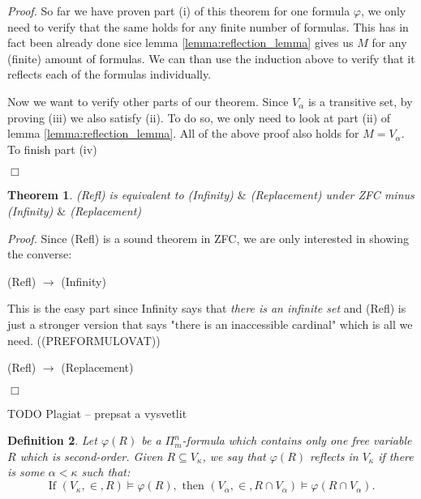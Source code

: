 \documentclass[12pt,a4paper]{article}
\newtheorem{theorem}{Theorem}[section]
\newtheorem{definition}[theorem]{Definition}
\newenvironment{proof}
{\noindent \textit{Proof.}}
{\hspace*{\fill} $\Box$}
\newcommand{\sub}{\subseteq}
\newcommand{\then}{\rightarrow}
\begin{document}
\begin{proof}
So far we have proven part (i) of this theorem for one formula $\varphi$, we only need to verify that the same holds for any finite number of formulas. This has in fact been already done sice lemma \ref{lemma:reflection_lemma} gives us $M$ for any (finite) amount of formulas. We can than use the induction above  to verify that it reflects each of the formulas individually. 

\medskip
Now we want to verify other parts of our theorem. Since $V_\alpha$ is a transitive set, by proving (iii) we also satisfy (ii). To do so, we only need to look at part (ii) of lemma \ref{lemma:reflection_lemma}. All of the above proof also holds for $M = V_\alpha$. To finish part (iv)

\end{proof}


\begin{theorem}
(Refl) is equivalent to (Infinity) $\&$ (Replacement) under ZFC minus (Infinity) $\&$ (Replacement)
\end{theorem}
\begin{proof}
Since (Refl) is a sound theorem in ZFC, we are only interested in showing the converse:

(Refl) $\then$ (Infinity)

This is the easy part since Infinity says that \emph{there is an infinite set} and (Refl) is just a stronger version that says "there is an inaccessible cardinal" which is all we need. ((PREFORMULOVAT))



(Refl) $\then$ (Replacement)

\end{proof}

TODO Plagiat -- prepsat a vysvetlit
\begin{definition}\label{def:reflection_2}
Let $\varphi(R)$ be a $\Pi^n_m$-formula which contains only one free variable $R$ which is second-order. Given $R \sub V_\kappa$, we say that $\varphi(R)$ reflects in $V_\kappa$ if there is some $\alpha<\kappa$ such that:
\begin{equation}
\mbox{If }(V_\kappa,\in, R)\models \varphi(R), \mbox{ then }(V_\alpha,\in, R\cap V_\alpha) \models \varphi(R\cap V_\alpha).
\end{equation}
\end{definition}

\newpage
\end{document}
